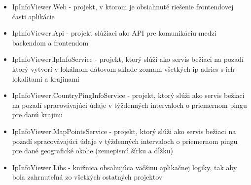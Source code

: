 \begin{itemize}
    \item IpInfoViewer.Web
    - projekt, v ktorom je obsiahnuté riešenie frontendovej časti aplikácie
    \item IpInfoViewer.Api
    - projekt slúžiaci ako API pre komunikáciu medzi backendom a frontendom
    \item IpInfoViewer.IpInfoService
    - projekt, ktorý slúži ako servis bežiaci na pozadí ktorý vytvorí v lokálnom dátovom sklade zoznam všetkých ip adries s ich lokalitami a krajinami
    \item IpInfoViewer.CountryPingInfoService
    - projekt, ktorý slúži ako servis bežiaci na pozadí spracovávajúci údaje v týždenných intervaloch o priemernom pingu pre danú krajinu
    \item IpInfoViewer.MapPointsService
    - projekt, ktorý slúži ako servis bežiaci na pozadí spracovávajúci údaje v týždenných intervaloch o priemernom pingu pre dané geografické 
    okolie (zemepisnú šírku a dĺžku)
    \item IpInfoViewer.Libs
    - knižnica obsahujúca väčšinu aplikačnej logiky, tak aby bola zahrnuteľná zo všetkých ostatných projektov
\end{itemize}

